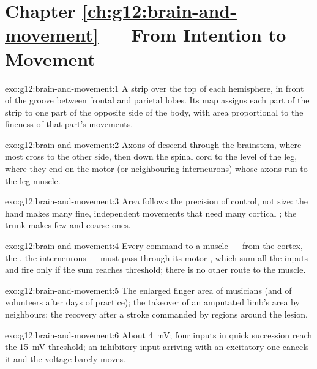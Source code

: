 \section*{Chapter \ref{ch:g12:brain-and-movement} --- From Intention to Movement}

\begin{solution}{exo:g12:brain-and-movement:1}
A strip over the top of each hemisphere, in front of the groove
between frontal and parietal lobes. Its map assigns each part of the
strip to one part of the opposite side of the body, with area
proportional to the fineness of that part's movements.
\end{solution}

\begin{solution}{exo:g12:brain-and-movement:2}
Axons of   descend through the brainstem, where
most cross to the other side, then down the spinal cord to the level
of the leg, where they end on the motor  (or neighbouring
interneurons) whose axons run to the leg muscle.
\end{solution}

\begin{solution}{exo:g12:brain-and-movement:3}
Area follows the precision of control, not size: the hand makes many
fine, independent movements that need many cortical ; the
trunk makes few and coarse ones.
\end{solution}

\begin{solution}{exo:g12:brain-and-movement:4}
Every command to a muscle --- from the cortex, the , the
interneurons --- must pass through its motor , which sum all
the inputs and fire only if the sum reaches threshold; there is no
other route to the muscle.
\end{solution}

\begin{solution}{exo:g12:brain-and-movement:5}
The enlarged finger area of musicians (and of volunteers after days of
practice); the takeover of an amputated limb's area by neighbours; the
recovery after a stroke commanded by regions around the lesion.
\end{solution}

\begin{solution}{exo:g12:brain-and-movement:6}
About \qty{4}{mV}; four inputs in quick succession reach the
\qty{15}{mV} threshold; an inhibitory input arriving with an
excitatory one cancels it and the voltage barely moves.
\end{solution}


